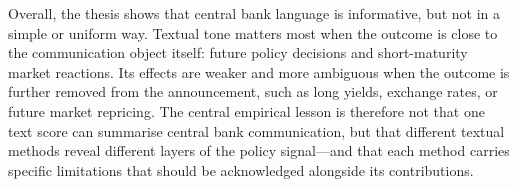 Overall, the thesis shows that central bank language is informative, but not in
a simple or uniform way. Textual tone matters most when the outcome is close to
the communication object itself: future policy decisions and short-maturity
market reactions. Its effects are weaker and more ambiguous when the outcome is
further removed from the announcement, such as long yields, exchange rates, or
future market repricing. The central empirical lesson is therefore not that one
text score can summarise central bank communication, but that different textual
methods reveal different layers of the policy signal---and that each method
carries specific limitations that should be acknowledged alongside its
contributions.